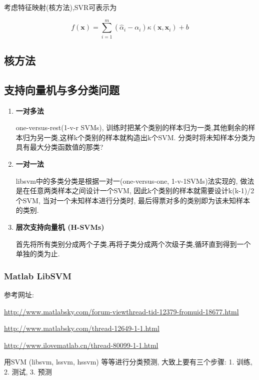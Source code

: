 \documentclass[12pt]{article}
\numberwithin{equation}{section}%
\begin{document}
考虑特征映射(核方法),SVR可表示为

\begin{equation}
f(\boldsymbol{x})=\sum_{i=1}^{m}(\hat{\alpha}_{i}-\alpha_{i})\kappa(\boldsymbol{x},\boldsymbol{x}_{i})+b
\label{•}
\end{equation}

\subsection{核方法}

\subsection{支持向量机与多分类问题}

\begin{enumerate}

\item{\textbf{一对多法}}

one-versus-rest(1-v-r SVMs), 训练时把某个类别的样本归为一类,其他剩余的样本归为另一类,这样k个类别的样本就构造出k个SVM. {\color{blue}分类时将未知样本分类为具有最大分类函数值的那类?}



\item{\textbf{一对一法}}    

libsvm中的多类分类是根据一对一(one-versus-one, 1-v-1SVMs)法实现的, 做法是在任意两类样本之间设计一个SVM, 因此k个类别的样本就需要设计k(k-1)/2个SVM, 当对一个未知样本进行分类时, 最后得票对多的类别即为该未知样本的类别. 

\item{\textbf{层次支持向量机 (H-SVMs)}}

首先将所有类别分成两个子类,再将子类分成两个次级子类,循环直到得到一个单独的类为止. 


\end{enumerate}

\subsubsection{Matlab LibSVM}
参考网址:

\url{http://www.matlabsky.com/forum-viewthread-tid-12379-fromuid-18677.html}

\url{http://www.matlabsky.com/thread-12649-1-1.html}

\url{http://www.ilovematlab.cn/thread-80099-1-1.html}


用SVM (libsvm, lssvm, hssvm) 等等进行分类预测, 大致上要有三个步骤: 1. 训练, 2. 测试,  3. 预测
\end{document}
